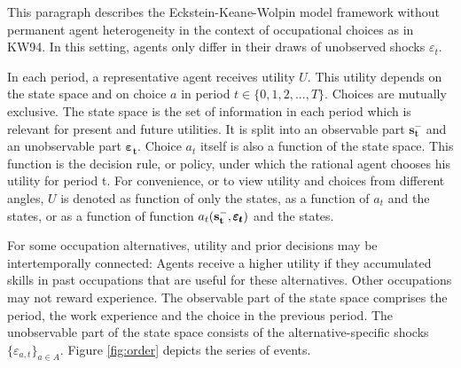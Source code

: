 \documentclass[a4paper,12pt]{article}
\begin{document}
\noindent
This paragraph describes the Eckstein-Keane-Wolpin model framework without permanent agent heterogeneity in the context of occupational choices as in KW94. In this setting, agents only differ in their draws of unobserved shocks $\varepsilon_t$.

In each period, a representative agent receives utility $U$. This utility depends on the state space and on choice $a$ in period $t \in \{0,1,2,...,T\}$. Choices are mutually exclusive. The state space is the set of information in each period which is relevant for present and future utilities. It is split into an observable part $\bm{s_t^-}$ and an unobservable part $\pmb{\varepsilon_{t}}$. Choice $a_t$ itself is also a function of the state space. This function is the decision rule, or policy, under which the rational agent chooses his utility for period t. For convenience, or to view utility and choices from different angles, $U$ is denoted as function of only the states, as a function of $a_t$ and the states, or as a function of function $a_t(\bold{s_t^-}, \pmb{\varepsilon_t})$ and the states.

For some occupation alternatives, utility and prior decisions may be intertemporally connected: Agents receive a higher utility if they accumulated skills in past occupations that are useful for these alternatives. Other occupations may not reward experience. The observable part of the state space comprises the period, the work experience and the choice in the previous period. The unobservable part of the state space consists of the alternative-specific shocks $\{\varepsilon_{a,t}\}_{a \in A}$. Figure \ref{fig:order} depicts the series of events.
\end{document}
